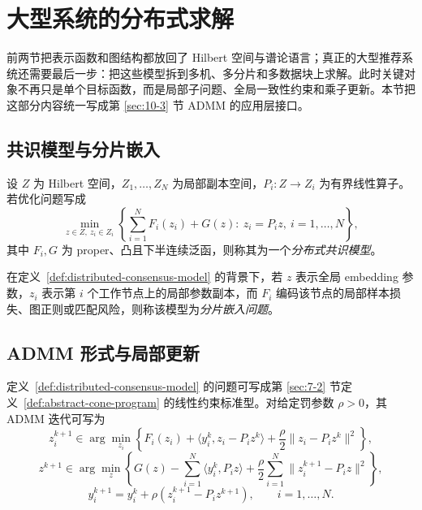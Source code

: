 \section{大型系统的分布式求解}

\label{sec:12-4}

前两节把表示函数和图结构都放回了 Hilbert 空间与谱论语言；真正的大型推荐系统还需要最后一步：把这些模型拆到多机、多分片和多数据块上求解。此时关键对象不再只是单个目标函数，而是局部子问题、全局一致性约束和乘子更新。本节把这部分内容统一写成第 \ref{sec:10-3} 节 ADMM 的应用层接口。

\subsection{共识模型与分片嵌入}

\begin{definition}[分布式共识模型]\label{def:distributed-consensus-model}
设 $Z$ 为 Hilbert 空间，$Z_1,\dots,Z_N$ 为局部副本空间，$P_i\colon Z\to Z_i$ 为有界线性算子。若优化问题写成
\[
\min_{z\in Z,\ z_i\in Z_i}
\left\{
\sum_{i=1}^N F_i(z_i)+G(z)
:\ z_i=P_i z,\ i=1,\dots,N
\right\},
\]
其中 $F_i,G$ 为 proper、凸且下半连续泛函，则称其为一个\emph{分布式共识模型}。
\end{definition}

\begin{definition}[分片嵌入问题]\label{def:sharded-embedding-problem}
在定义~\ref{def:distributed-consensus-model} 的背景下，若 $z$ 表示全局 embedding 参数，$z_i$ 表示第 $i$ 个工作节点上的局部参数副本，而 $F_i$ 编码该节点的局部样本损失、图正则或匹配风险，则称该模型为\emph{分片嵌入问题}。
\end{definition}

\subsection{ADMM 形式与局部更新}

\begin{proposition}\label{prop:consensus-admm-splitting}
定义~\ref{def:distributed-consensus-model} 的问题可写成第 \ref{sec:7-2} 节定义~\ref{def:abstract-cone-program} 的线性约束标准型。对给定罚参数 $\rho>0$，其 ADMM 迭代可写为
\[
z_i^{k+1}\in
\arg\min_{z_i}
\left\{
F_i(z_i)+\langle y_i^k,z_i-P_i z^k\rangle+\frac{\rho}{2}\|z_i-P_i z^k\|^2
\right\},
\]
\[
z^{k+1}\in
\arg\min_z
\left\{
G(z)-\sum_{i=1}^N \langle y_i^k,P_i z\rangle
+\frac{\rho}{2}\sum_{i=1}^N \|z_i^{k+1}-P_i z\|^2
\right\},
\]
\[
y_i^{k+1}=y_i^k+\rho(z_i^{k+1}-P_i z^{k+1}),
\qquad i=1,\dots,N.
\]
\end{proposition}

